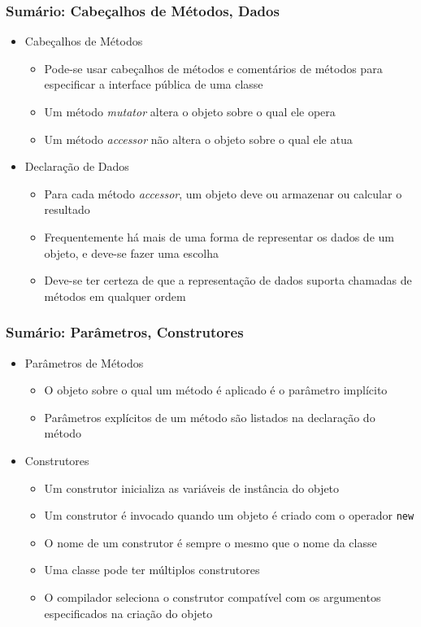 \documentclass[xcolor={dvipsnames,table},aspectratio=169]{beamer}
\begin{document}
\begin{frame}\frametitle{Sumário: Cabeçalhos de Métodos, Dados}
\begin{itemize}
	\item Cabeçalhos de Métodos
	\begin{itemize}
		\item Pode-se usar cabeçalhos de métodos e comentários de métodos para especificar a interface pública de uma classe
		\item Um método \emph{mutator} altera o objeto sobre o qual ele opera
		\item Um método \emph{accessor} não altera o objeto sobre o qual ele atua
	\end{itemize}
	\item Declaração de Dados
	\begin{itemize}
		\item Para cada método \emph{accessor}, um objeto deve ou armazenar ou calcular o resultado
		\item Frequentemente há mais de uma forma de representar os dados de um objeto, e deve-se fazer uma escolha
		\item Deve-se ter certeza de que a representação de dados suporta chamadas de métodos em qualquer ordem
	\end{itemize}
\end{itemize}
\end{frame}

\begin{frame}\frametitle{Sumário: Parâmetros, Construtores}
\begin{itemize}
	\item Parâmetros de Métodos
	\begin{itemize}
		\item O objeto sobre o qual um método é aplicado é o parâmetro implícito
		\item Parâmetros explícitos de um método são listados na declaração do método
	\end{itemize}
	\item Construtores
	\begin{itemize}
		\item Um construtor inicializa as variáveis de instância do objeto
		\item Um construtor é invocado quando um objeto é criado com o operador \texttt{new}
		\item O nome de um construtor é sempre o mesmo que o nome da classe
		\item Uma classe pode ter múltiplos construtores
		\item O compilador seleciona o construtor compatível com os argumentos especificados na criação do objeto
	\end{itemize}
\end{itemize}
\end{frame}
\end{document}
